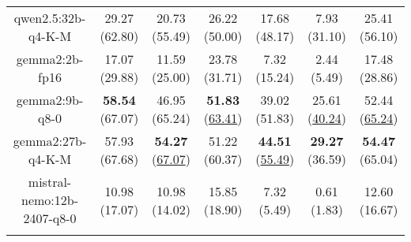 \begin{table}[hbp]
{\begin{tabular}{ccccccc}
      \multicolumn{1}{c|}{qwen2.5:32b-q4-K-M} & 29.27 (62.80) & 20.73 (55.49) & \multicolumn{1}{c|}{26.22 (50.00)} & 17.68 (48.17) & \multicolumn{1}{c|}{7.93 (31.10)} & 25.41 (56.10) \\


      \multicolumn{1}{c|}{gemma2:2b-fp16} & 17.07 (29.88) & 11.59 (25.00) & \multicolumn{1}{c|}{23.78 (31.71)} & 7.32 (15.24) & \multicolumn{1}{c|}{2.44 (5.49)} & 17.48 (28.86) \\


      \multicolumn{1}{c|}{gemma2:9b-q8-0} & \textbf{58.54} (67.07) & 46.95 (65.24) & \multicolumn{1}{c|}{\textbf{51.83} (\underline{63.41})} & 39.02 (51.83) & \multicolumn{1}{c|}{25.61 (\underline{40.24})} & 52.44 (\underline{65.24}) \\


      \multicolumn{1}{c|}{gemma2:27b-q4-K-M} & 57.93 (67.68) & \textbf{54.27} (\underline{67.07}) & \multicolumn{1}{c|}{51.22 (60.37)} & \textbf{44.51} (\underline{55.49}) & \multicolumn{1}{c|}{\textbf{29.27} (36.59)} & \textbf{54.47} (65.04) \\


      \multicolumn{1}{c|}{mistral-nemo:12b-2407-q8-0} & 10.98 (17.07) & 10.98 (14.02) & \multicolumn{1}{c|}{15.85 (18.90)} & 7.32 (5.49) & \multicolumn{1}{c|}{0.61 (1.83)} & 12.60 (16.67) \\

      \\ \hline
    \end{tabular}%
  }
\end{table}